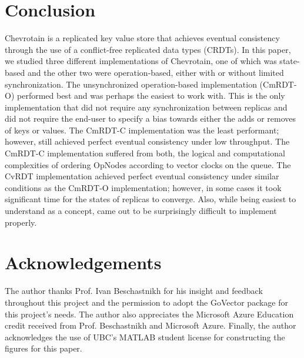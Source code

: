 \documentclass[sigconf,nonacm,10pt]{acmart}
\begin{document}
\section{Conclusion}
Chevrotain is a replicated key value store that achieves eventual consistency through the use of a conflict-free replicated data types (CRDTs). In this paper, we studied three different implementations of Chevrotain, one of which was state-based and the other two were operation-based, either with or without limited synchronization. The unsynchronized operation-based implementation (CmRDT-O) performed best and was perhaps the easiest to work with. This is the only implementation that did not require any synchronization between replicas and did not require the end-user to specify a bias towards either the adds or removes of keys or values. The CmRDT-C implementation was the least performant; however, still achieved perfect eventual consistency under low throughput. The CmRDT-C implementation suffered from both, the logical and computational complexities of ordering OpNodes according to vector clocks on the queue. The CvRDT implementation achieved perfect eventual consistency under similar conditions as the CmRDT-O implementation; however, in some cases it took significant time for the states of replicas to converge. Also, while being easiest to understand as a concept, came out to be surprisingly difficult to implement properly. 

\section*{Acknowledgements}
The author thanks Prof. Ivan Beschastnikh for his insight and feedback throughout this project and the permission to adopt the GoVector package for this project's needs. The author also appreciates the Microsoft Azure Education credit received from Prof. Beschastnikh and Microsoft Azure. Finally, the author acknowledges the use of UBC's MATLAB student license for constructing the figures for this paper.



\end{document}

